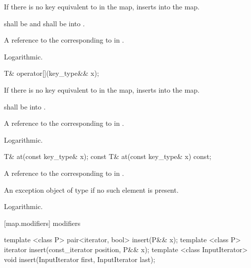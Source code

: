 \begin{itemdescr}
\pnum
\effects
If there is no key equivalent to  in the map, inserts
into the map.

\pnum
\requires {} shall be
 and  shall be
 into .

\pnum
\returns
A reference to the
corresponding to  in
.

\pnum
\complexity Logarithmic.
\end{itemdescr}

%
\begin{itemdecl}
T& operator[](key_type&& x);
\end{itemdecl}

\begin{itemdescr}
\pnum
\effects
If there is no key equivalent to  in the map, inserts
into the map.

\pnum
\requires {} shall be
 into .

\pnum
\returns
A reference to the
corresponding to  in
.

\pnum
\complexity Logarithmic.
\end{itemdescr}

%
\begin{itemdecl}
T&       at(const key_type& x);
const T& at(const key_type& x) const;
\end{itemdecl}

\begin{itemdescr}
\pnum
\returns
A reference to the  corresponding to  in .

\pnum
\throws
An exception object of type  if
no such element is present.

\pnum
\complexity Logarithmic.
\end{itemdescr}

[map.modifiers]{ modifiers}

%
%
\begin{itemdecl}
template <class P> pair<iterator, bool> insert(P&& x);
template <class P> iterator insert(const_iterator position, P&& x);
template <class InputIterator>
  void insert(InputIterator first, InputIterator last);
\end{itemdecl}

